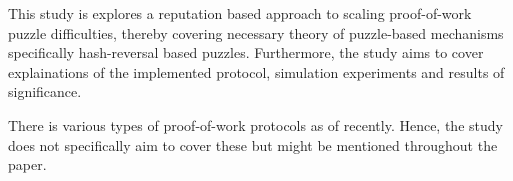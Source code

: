 This study is explores a reputation based approach to scaling proof-of-work puzzle difficulties, thereby covering necessary theory of puzzle-based mechanisms specifically hash-reversal based puzzles. Furthermore, the study aims to cover explainations of the implemented protocol, simulation experiments and results of significance. 

There is various types of proof-of-work protocols as of recently. Hence, the study does not specifically aim to cover these but might be mentioned throughout the paper. 

\begin{comment}
Scope: \\
The coverage of this study ..... \\
The study consists of ..... \\
The study covers the ..... \\
This study is focus on ..... \\

Delimitations: \\
The study does not cover the ..... \\
The researcher limited this research to ..... \\
This study is limited to ..... \\
\end{comment}